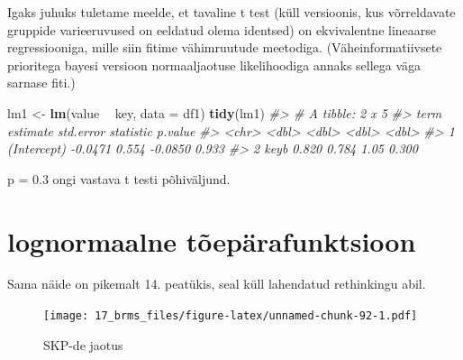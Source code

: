 \documentclass[]{book}
\newenvironment{Shaded}{\begin{snugshade}}{\end{snugshade}}
\newcommand{\CommentTok}[1]{\textcolor[rgb]{0.56,0.35,0.01}{\textit{#1}}}
\newcommand{\DataTypeTok}[1]{\textcolor[rgb]{0.13,0.29,0.53}{#1}}
\newcommand{\DecValTok}[1]{\textcolor[rgb]{0.00,0.00,0.81}{#1}}
\newcommand{\KeywordTok}[1]{\textcolor[rgb]{0.13,0.29,0.53}{\textbf{#1}}}
\newcommand{\NormalTok}[1]{#1}
\newcommand{\OperatorTok}[1]{\textcolor[rgb]{0.81,0.36,0.00}{\textbf{#1}}}
\newcommand{\StringTok}[1]{\textcolor[rgb]{0.31,0.60,0.02}{#1}}
\begin{document}
Igaks juhuks tuletame meelde, et tavaline t test (küll versioonis, kus võrreldavate gruppide varieeruvused on eeldatud olema identsed) on ekvivalentne lineaarse regressiooniga, mille siin fitime vähimruutude meetodiga. (Väheinformatiivsete prioritega bayesi versioon normaaljaotuse likelihoodiga annaks sellega väga sarnase fiti.)

\begin{Shaded}
\begin{Highlighting}[]
\NormalTok{lm1 <-}\StringTok{ }\KeywordTok{lm}\NormalTok{(value }\OperatorTok{~}\StringTok{ }\NormalTok{key, }\DataTypeTok{data =}\NormalTok{ df1)}
\KeywordTok{tidy}\NormalTok{(lm1)}
\CommentTok{#> # A tibble: 2 x 5}
\CommentTok{#>   term        estimate std.error statistic p.value}
\CommentTok{#>   <chr>          <dbl>     <dbl>     <dbl>   <dbl>}
\CommentTok{#> 1 (Intercept)  -0.0471     0.554   -0.0850   0.933}
\CommentTok{#> 2 keyb          0.820      0.784    1.05     0.300}
\end{Highlighting}
\end{Shaded}

p = 0.3 ongi vastava t testi põhiväljund.

\hypertarget{lognormaalne-toeparafunktsioon}{%
\section{lognormaalne tõepärafunktsioon}\label{lognormaalne-toeparafunktsioon}}

Sama näide on pikemalt 14. peatükis, seal küll lahendatud rethinkingu abil.

\begin{Shaded}
\end{Shaded}

\begin{figure}
\centering
\texttt{[image: 17\_brms\_files/figure-latex/unnamed-chunk-92-1.pdf]}
\caption{\label{fig:unnamed-chunk-92}SKP-de jaotus}
\end{figure}
\end{document}
